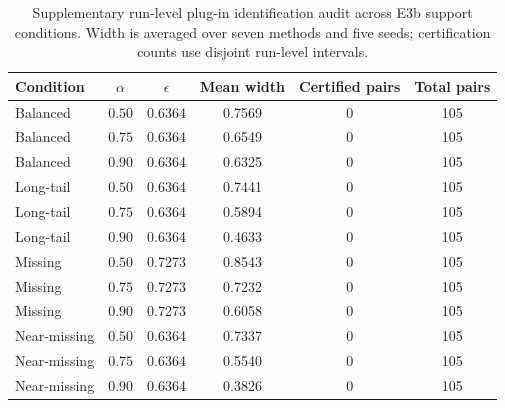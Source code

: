\begin{table}[t]
\centering
\small
\caption{Supplementary run-level plug-in identification audit across E3b support conditions. Width is averaged over seven methods and five seeds; certification counts use disjoint run-level intervals.}
\label{tab:identification-audit-all}
\begin{tabular}{@{}lccccc@{}}
\toprule
Condition & $\alpha$ & $\epsilon$ & Mean width & Certified pairs & Total pairs \\
\midrule
Balanced & $0.50$ & 0.6364 & 0.7569 & 0 & 105 \\
Balanced & $0.75$ & 0.6364 & 0.6549 & 0 & 105 \\
Balanced & $0.90$ & 0.6364 & 0.6325 & 0 & 105 \\
Long-tail & $0.50$ & 0.6364 & 0.7441 & 0 & 105 \\
Long-tail & $0.75$ & 0.6364 & 0.5894 & 0 & 105 \\
Long-tail & $0.90$ & 0.6364 & 0.4633 & 0 & 105 \\
Missing & $0.50$ & 0.7273 & 0.8543 & 0 & 105 \\
Missing & $0.75$ & 0.7273 & 0.7232 & 0 & 105 \\
Missing & $0.90$ & 0.7273 & 0.6058 & 0 & 105 \\
Near-missing & $0.50$ & 0.6364 & 0.7337 & 0 & 105 \\
Near-missing & $0.75$ & 0.6364 & 0.5540 & 0 & 105 \\
Near-missing & $0.90$ & 0.6364 & 0.3826 & 0 & 105 \\
\bottomrule
\end{tabular}
\end{table}
